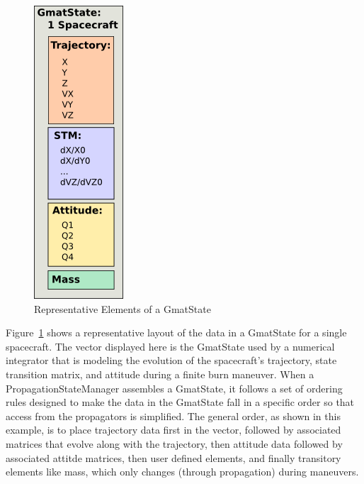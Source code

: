 \begin{figure}[htb]
\begin{center}
\includegraphics[63,207]{Images/PropVectorComponents.png}
\caption{\label{figure:PropVectorComponents}Representative Elements of a GmatState}
\end{center}
\end{figure}

Figure~\ref{figure:PropVectorComponents} shows a representative layout of the data in a GmatState
for a single spacecraft.  The vector displayed here is the GmatState used by a numerical
integrator that is modeling the evolution of the spacecraft's trajectory, state transition matrix,
and attitude during a finite burn maneuver.  When a PropagationStateManager assembles a GmatState,
it follows a set of ordering rules designed to make the data in the GmatState fall in a specific
order so that access from the propagators is simplified.  The general order, as shown in this
example, is to place trajectory data first in the vector, followed by associated matrices that
evolve along with the trajectory, then attitude data followed by associated attitde matrices, then
user defined elements, and finally transitory elements like mass, which only changes (through
propagation) during maneuvers.

